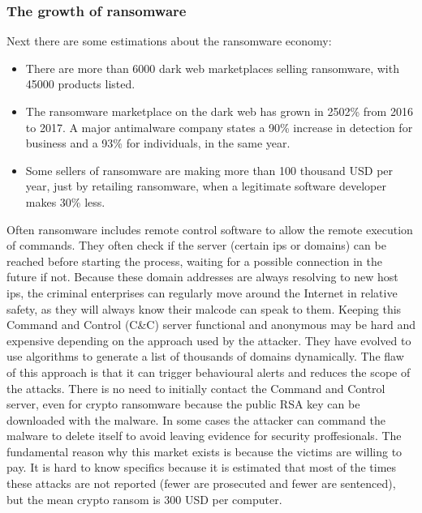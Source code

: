 \subsubsection{The growth of ransomware}
Next there are some estimations about the ransomware economy\cite{ransomware_economy}:
\begin{itemize}
	\item There are more than 6000 dark web marketplaces selling ransomware, with 45000 products listed.
	\item The ransomware marketplace on the dark web has grown in 2502\% from 2016 to 2017.
A major antimalware company states a 90\% increase in detection for business and a 93\% for individuals, in the same year\cite{ransomware_malwarebytes}.
	\item Some sellers of ransomware are making more than 100 thousand USD per year, just by retailing ransomware, when a legitimate software developer makes 30\% less.
\end{itemize}
\linej
Often ransomware includes remote control software to allow the remote execution of commands.
They often check if the server (certain ips or domains) can be reached before starting the process, waiting for a possible connection in the future if not.
Because these domain addresses are always resolving to new host ips, the criminal enterprises can regularly move around the Internet in relative safety, as they will always know their malcode can speak to them.
Keeping this Command and Control (C\&C) server functional and anonymous may be hard and expensive depending on the approach used by the attacker.
They have evolved to use algorithms to generate a list of thousands of domains dynamically.
\linej
The flaw of this approach is that it can trigger behavioural alerts and reduces the scope of the attacks.
There is no need to initially contact the Command and Control server, even for crypto ransomware because the public RSA key can be downloaded with the malware.
In some cases the attacker can command the malware to delete itself to avoid leaving evidence for security proffesionals\cite{ransomware_oReilly}\cite{ransomware_digital_extortion}.
\linej
\linej
The fundamental reason why this market exists is because the victims are willing to pay.
It is hard to know specifics because it is estimated that most of the times these attacks are not reported (fewer are prosecuted and fewer are sentenced), but the mean crypto ransom is 300 USD per computer\cite{ransomware_digital_extortion}.
\linej

